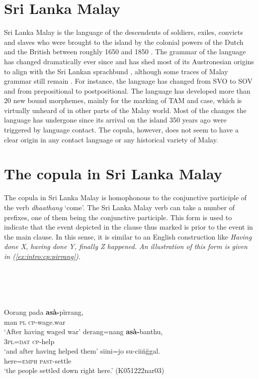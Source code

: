 \documentclass[a4paper,12pt]{article}
\newcommand{\xbox}[2]{\noindent\parbox[t]{#1}{#2}\noindent}
\newcommand{\xref}[1]{(\ref{#1})}
\newcommand{\trs}[2]{{\em #1\em} `#2'}
\newcommand{\ea}{\\\\}
\newcommand{\z}{\\\\}
\begin{document}
\section{Sri Lanka Malay}\label{sec:introslm}
Sri Lanka Malay is the language of the descendents of soldiers, exiles, convicts and slaves who were brought to the island by the colonial powers of the Dutch and the British between roughly 1650 and 1850 \citep{Hussainmiya1990}. The grammar of the language has changed dramatically ever since \citep{Adelaar1991,SmithEtAl2004,Ansaldo2008genesis,Nordhoff2009phd} and has shed most of its Austronesian origins to align with the Sri Lankan sprachbund \citep{Bakker2006}, although some traces of Malay grammar still remain \citep{Slomanson2006cll}. For instance, the language has changed from SVO to SOV and from prepositional to postpositional. The language has developed more than 20 new bound morphemes, mainly for the marking of TAM and case, which is virtually unheard of in other parts of the Malay world.  Most of the changes the language has undergone since its arrival on the island 350 years ago were triggered by language contact. The copula, however, does not seem to have a clear origin in any contact language or any historical variety of Malay.

\section{The copula in Sri Lanka Malay}\label{sec:slmcopula}
The copula in Sri Lanka Malay is homophonous to the conjunctive participle of the verb \trs{dhaathang}{come}.
The Sri Lanka Malay verb can take a number of prefixes, one of them being the conjunctive participle. This form is used to indicate that the event depicted in the clause thus marked is prior to the event in the main clause. In this sense, it is similar to an English construction like \em Having done X, having done Y, finally Z happened\em. An illustration of this form is given in \xref{ex:intro:cp:pirrang}.

\xbox{\textwidth}{
\ea\label{ex:intro:cp:pirrang}
 \ea 
 \gll Oorang pada \textbf{asà-}pìrrang, \\
	 man \textsc{pl} \textsc{cp}-wage.war  \\
	`After having waged war'
	\ex
 \gll derang=nang \textbf{asà-}banthu, \\
	\textsc{3pl}=\textsc{dat} \textsc{cp}-help\\
	`and after having helped them'
	\ex
	\gll siini=jo su-cii\u n\u ggal. \\ %
	here=\textsc{emph} \textsc{past}-settle\\
	`the people settled down right here.' (K051222nar03)
	\z
\z
}
\end{document}
